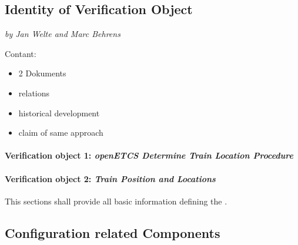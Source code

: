 \subsection{Identity of Verification Object}

\textit{by Jan Welte and Marc Behrens}

Contant:
\begin{itemize}
\item 2 Dokuments
\item relations
\item historical development
\item claim of same approach
\end{itemize}


\paragraph{Verification object 1: \textit{openETCS Determine Train Location Procedure}}
\nl

\paragraph{Verification object 2: \textit{Train Position and Locations}}
\nl

This sections shall provide all basic information defining the .





\subsection{Configuration related Components}

